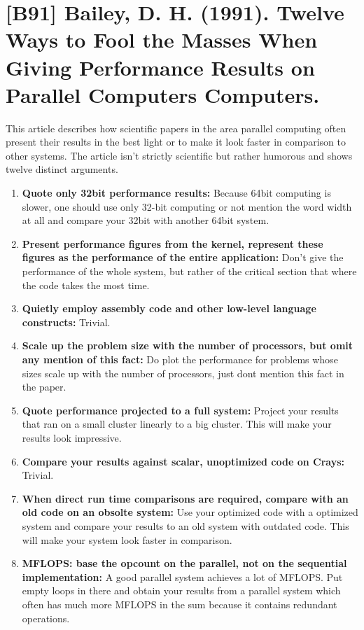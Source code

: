 \documentclass[a4paper,12pt,english]{scrartcl}
\newcommand{\papertitle}[2]{
	\section{[#1] #2}
}
\begin{document}
\pagestyle{fancy} %

\papertitle{B91}{Bailey, D. H. (1991). Twelve Ways to Fool the Masses When Giving Performance Results on Parallel Computers Computers.}

This article describes how scientific papers in the area parallel computing often present their results in the best light or to make it look faster in comparison to other systems. The article isn't strictly scientific but rather humorous and shows twelve distinct arguments.

\begin{enumerate}[noitemsep]
	\item \textbf{Quote only 32bit performance results:} Because 64bit computing is slower, one should use only 32-bit computing or not mention the word width at all and compare your 32bit with another 64bit system.
	\item \textbf{Present performance figures from the kernel, represent these figures as the performance of the entire application:} Don't give the performance of the whole system, but rather of the critical section that where the code takes the most time.
	\item \textbf{Quietly employ assembly code and other low-level language constructs:} Trivial.
	\item \textbf{Scale up the problem size with the number of processors, but omit any mention of this fact:} Do plot the performance for problems whose sizes scale up with the number of processors, just dont mention this fact in the paper.
	\item \textbf{Quote performance projected to a full system:} Project your results that ran on a small cluster linearly to a big cluster. This will make your results look impressive.
	\item \textbf{Compare your results against scalar, unoptimized code on Crays:} Trivial.
	\item \textbf{When direct run time comparisons are required, compare with an old code on an obsolte system:} Use your optimized code with a optimized system and compare your results to an old system with outdated code. This will make your system look faster in comparison.
	\item \textbf{MFLOPS: base the opcount on the parallel, not on the sequential implementation:} A good parallel system achieves a lot of MFLOPS. Put empty loops in there and obtain your results from a parallel system which often has much more MFLOPS in the sum because it contains redundant operations.

\end{enumerate}
\end{document}
